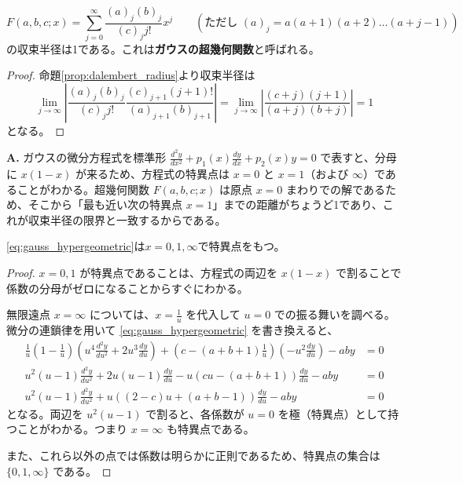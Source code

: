\begin{lemma}[ガウスの超幾何関数]\label{lem:hypergeometric}
    \[
        F(a,b,c;x)=\sum_{j=0}^{\infty}\frac{(a)_{j}(b)_{j}}{(c)_{j}j!}x^{j} \qquad \left( \text{ただし } (a)_{j}=a(a+1)(a+2)\dots(a+j-1) \right)
    \]
    の収束半径は1である。これは\textbf{ガウスの超幾何関数}と呼ばれる。
\end{lemma}

\begin{proof}
    命題\ref{prop:dalembert_radius}より収束半径は
    \[
    \lim_{j\to\infty}\left| \frac{(a)_{j}(b)_{j}}{(c)_{j}j!} \frac{(c)_{j+1}(j+1)!}{(a)_{j+1}(b)_{j+1}} \right| = \lim_{j\to\infty}\left| \frac{(c+j)(j+1)}{(a+j)(b+j)} \right| = 1
    \]
    となる。
\end{proof}

\begin{Q}
\textbf{A.} ガウスの微分方程式を標準形 $\frac{d^2y}{dx^2} + p_1(x)\frac{dy}{dx} + p_2(x)y = 0$ で表すと、分母に $x(1-x)$ が来るため、方程式の特異点は $x=0$ と $x=1$（および $\infty$）であることがわかる。超幾何関数 $F(a,b,c;x)$ は原点 $x=0$ まわりでの解であるため、そこから「最も近い次の特異点 $x=1$」までの距離がちょうど1であり、これが収束半径の限界と一致するからである。
\end{Q}
\begin{lemma}
    \eqref{eq:gauss_hypergeometric}は$x=0,1,\infty$で特異点をもつ。
\end{lemma}

\begin{proof}
    $x=0, 1$ が特異点であることは、方程式の両辺を $x(1-x)$ で割ることで係数の分母がゼロになることからすぐにわかる。

    無限遠点 $x=\infty$ については、$x=\frac{1}{u}$ を代入して $u=0$ での振る舞いを調べる。微分の連鎖律を用いて \eqref{eq:gauss_hypergeometric} を書き換えると、
    \begin{align*}
    \frac{1}{u}\left(1-\frac{1}{u}\right)\left(u^{4}\frac{d^{2}y}{du^{2}}+2u^{3}\frac{dy}{du}\right)+\left(c-(a+b+1)\frac{1}{u}\right)\left(-u^{2}\frac{dy}{du}\right)-aby &= 0 \\
    u^{2}(u-1)\frac{d^{2}y}{du^{2}}+2u(u-1)\frac{dy}{du}-u(cu-(a+b+1))\frac{dy}{du}-aby &= 0 \\
    u^{2}(u-1)\frac{d^{2}y}{du^{2}}+u((2-c)u+(a+b-1))\frac{dy}{du}-aby &= 0
    \end{align*}
    となる。両辺を $u^{2}(u-1)$ で割ると、各係数が $u=0$ を極（特異点）として持つことがわかる。つまり $x=\infty$ も特異点である。

    また、これら以外の点では係数は明らかに正則であるため、特異点の集合は $\{0,1,\infty\}$ である。
\end{proof}

